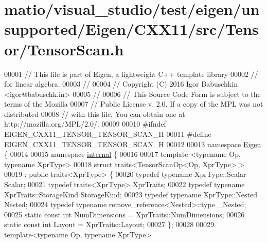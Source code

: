 \hypertarget{matio_2visual__studio_2test_2eigen_2unsupported_2_eigen_2_c_x_x11_2src_2_tensor_2_tensor_scan_8h_source}{}\section{matio/visual\+\_\+studio/test/eigen/unsupported/\+Eigen/\+C\+X\+X11/src/\+Tensor/\+Tensor\+Scan.h}
\label{matio_2visual__studio_2test_2eigen_2unsupported_2_eigen_2_c_x_x11_2src_2_tensor_2_tensor_scan_8h_source}

\begin{DoxyCode}
00001 \textcolor{comment}{// This file is part of Eigen, a lightweight C++ template library}
00002 \textcolor{comment}{// for linear algebra.}
00003 \textcolor{comment}{//}
00004 \textcolor{comment}{// Copyright (C) 2016 Igor Babuschkin <igor@babuschk.in>}
00005 \textcolor{comment}{//}
00006 \textcolor{comment}{// This Source Code Form is subject to the terms of the Mozilla}
00007 \textcolor{comment}{// Public License v. 2.0. If a copy of the MPL was not distributed}
00008 \textcolor{comment}{// with this file, You can obtain one at http://mozilla.org/MPL/2.0/.}
00009 
00010 \textcolor{preprocessor}{#ifndef EIGEN\_CXX11\_TENSOR\_TENSOR\_SCAN\_H}
00011 \textcolor{preprocessor}{#define EIGEN\_CXX11\_TENSOR\_TENSOR\_SCAN\_H}
00012 
00013 \textcolor{keyword}{namespace }\hyperlink{namespace_eigen}{Eigen} \{
00014 
00015 \textcolor{keyword}{namespace }\hyperlink{namespaceinternal}{internal} \{
00016 
00017 \textcolor{keyword}{template} <\textcolor{keyword}{typename} Op, \textcolor{keyword}{typename} XprType>
00018 \textcolor{keyword}{struct }traits<TensorScanOp<Op, XprType> >
00019     : \textcolor{keyword}{public} traits<XprType> \{
00020   \textcolor{keyword}{typedef} \textcolor{keyword}{typename} XprType::Scalar Scalar;
00021   \textcolor{keyword}{typedef} traits<XprType> XprTraits;
00022   \textcolor{keyword}{typedef} \textcolor{keyword}{typename} XprTraits::StorageKind StorageKind;
00023   \textcolor{keyword}{typedef} \textcolor{keyword}{typename} XprType::Nested Nested;
00024   \textcolor{keyword}{typedef} \textcolor{keyword}{typename} remove\_reference<Nested>::type \_Nested;
00025   \textcolor{keyword}{static} \textcolor{keyword}{const} \textcolor{keywordtype}{int} NumDimensions = XprTraits::NumDimensions;
00026   \textcolor{keyword}{static} \textcolor{keyword}{const} \textcolor{keywordtype}{int} Layout = XprTraits::Layout;
00027 \};
00028 
00029 \textcolor{keyword}{template}<\textcolor{keyword}{typename} Op, \textcolor{keyword}{typename} XprType>

\end{DoxyCode}
